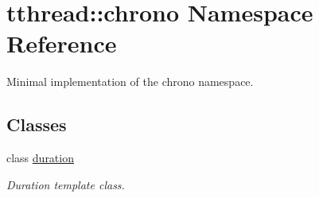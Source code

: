 \hypertarget{namespacetthread_1_1chrono}{}\section{tthread\+:\+:chrono Namespace Reference}
\label{namespacetthread_1_1chrono}


Minimal implementation of the {\ttfamily chrono} namespace.  


\subsection*{Classes}
\begin{DoxyCompactItemize}
\item 
class \hyperlink{classtthread_1_1chrono_1_1duration}{duration}
\begin{DoxyCompactList}\small\item\em Duration template class. \end{DoxyCompactList}\end{DoxyCompactItemize}
